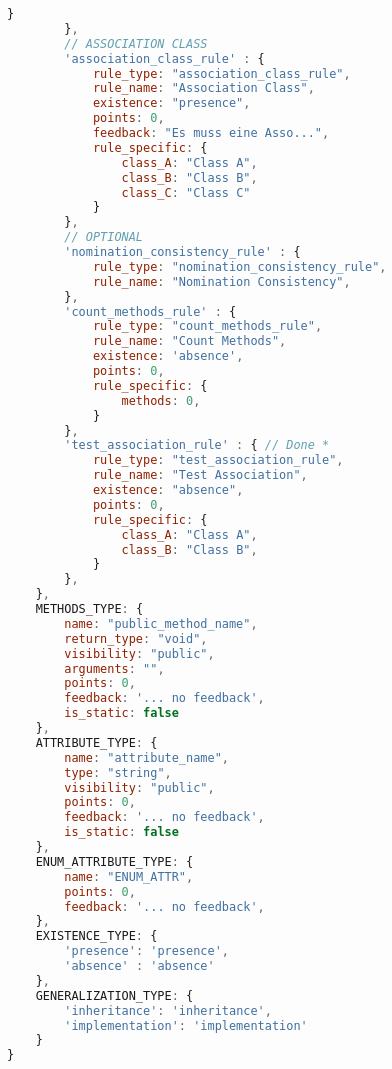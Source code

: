 \begin{lstlisting}[caption={Rules Definition JSON}, label={lst:rules_def}, language=javascript]
            }
        },
        // ASSOCIATION CLASS
        'association_class_rule' : {
            rule_type: "association_class_rule",
            rule_name: "Association Class",
            existence: "presence",
            points: 0,
            feedback: "Es muss eine Asso...",
            rule_specific: {
                class_A: "Class A",
                class_B: "Class B",
                class_C: "Class C"
            }
        },
        // OPTIONAL
        'nomination_consistency_rule' : {
            rule_type: "nomination_consistency_rule",
            rule_name: "Nomination Consistency",
        },
        'count_methods_rule' : {
            rule_type: "count_methods_rule",
            rule_name: "Count Methods",
            existence: 'absence',
            points: 0,
            rule_specific: {
                methods: 0,
            }
        },
        'test_association_rule' : { // Done *
            rule_type: "test_association_rule",
            rule_name: "Test Association",
            existence: "absence",
            points: 0,
            rule_specific: {
                class_A: "Class A",
                class_B: "Class B",
            }
        },
    },
    METHODS_TYPE: {
        name: "public_method_name",
        return_type: "void",
        visibility: "public",
        arguments: "",
        points: 0,
        feedback: '... no feedback',
        is_static: false
    },
    ATTRIBUTE_TYPE: {
        name: "attribute_name",
        type: "string",
        visibility: "public",
        points: 0,
        feedback: '... no feedback',
        is_static: false
    },
    ENUM_ATTRIBUTE_TYPE: {
        name: "ENUM_ATTR",
        points: 0,
        feedback: '... no feedback',
    },
    EXISTENCE_TYPE: {
        'presence': 'presence',
        'absence' : 'absence'
    },
    GENERALIZATION_TYPE: {
        'inheritance': 'inheritance',
        'implementation': 'implementation'
    }
}
\end{lstlisting}